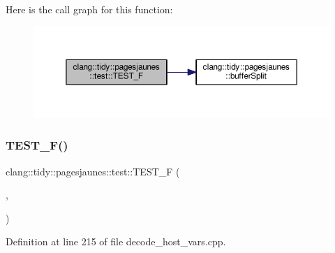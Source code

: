 Here is the call graph for this function\+:
\nopagebreak
\begin{figure}[H]
\begin{center}
\leavevmode
\includegraphics[width=350pt]{namespaceclang_1_1tidy_1_1pagesjaunes_1_1test_abdaff4f1b90a3db57f59ba18a26451a6_cgraph}
\end{center}
\end{figure}
\mbox{\label{namespaceclang_1_1tidy_1_1pagesjaunes_1_1test_ab140ea948434f84c1119e3df2cf8fb26}} 
\subsubsection{\texorpdfstring{T\+E\+S\+T\+\_\+\+F()}{TEST\_F()}\hspace{0.1cm}{\footnotesize\ttfamily [47/57]}}
{\footnotesize\ttfamily clang\+::tidy\+::pagesjaunes\+::test\+::\+T\+E\+S\+T\+\_\+F (\begin{DoxyParamCaption}\item[{\hyperlink{classclang_1_1tidy_1_1pagesjaunes_1_1test_1_1_decode_host_vars_test}{Decode\+Host\+Vars\+Test}}]{,  }\item[{Decode\+Host\+Vars\+Limit0}]{ }\end{DoxyParamCaption})}



Definition at line 215 of file decode\+\_\+host\+\_\+vars.\+cpp.

